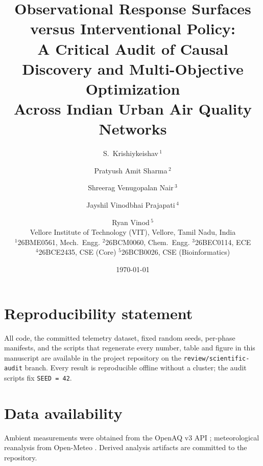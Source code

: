 \documentclass[11pt,a4paper]{article}
\title{\bfseries Observational Response Surfaces versus Interventional Policy:\\
A Critical Audit of Causal Discovery and Multi-Objective Optimization\\
Across Indian Urban Air Quality Networks}
\author{%
  S.~Krishiykeishav\,$^{1}$ \and Pratyush Amit Sharma\,$^{2}$ \and
  Shreerag Venugopalan Nair\,$^{3}$ \and Jayshil Vinodbhai Prajapati\,$^{4}$ \and
  Ryan Vinod\,$^{5}$ \\[6pt]
  \normalsize Vellore Institute of Technology (VIT), Vellore, Tamil Nadu, India \\[3pt]
  \footnotesize $^{1}$26BME0561, Mech.\ Engg. \quad
  $^{2}$26BCM0060, Chem.\ Engg. \quad
  $^{3}$26BEC0114, ECE \\[1pt]
  \footnotesize $^{4}$26BCE2435, CSE (Core) \quad
  $^{5}$26BCB0026, CSE (Bioinformatics)%
}
\date{\today}
\theoremstyle{plain}
\theoremstyle{definition}
\theoremstyle{remark}
\begin{document}
\maketitle










\section*{Reproducibility statement}
All code, the committed telemetry dataset, fixed random seeds, per-phase
manifests, and the scripts that regenerate every number, table and figure in
this manuscript are available in the project repository on the
\texttt{review/scientific-audit} branch. Every result is reproducible offline
without a cluster; the audit scripts fix \texttt{SEED = 42}.

\section*{Data availability}
Ambient measurements were obtained from the OpenAQ v3 API \citep{openaq};
meteorological reanalysis from Open-Meteo \citep{openmeteo}. Derived analysis
artifacts are committed to the repository.



\end{document}
